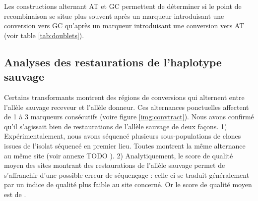 Les constructions alternant AT et GC permettent de déterminer si le point de
recombinaison se situe plus souvent après un marqueur introduisant une
conversion vers GC qu'après un marqueur introduisant une conversion vers AT
(voir table \ref{tab:doublets}).



\subsection{Analyses des restaurations de l'haplotype sauvage}
\label{subsec:restaur}


Certains transformants montrent des régions de conversions qui alternent entre
l'allèle sauvage receveur et l'allèle donneur. Ces alternances ponctuelles
affectent de 1 à 3 marqueurs consécutifs (voire figure \ref{img:convtract}).
Nous avons confirmé qu'il s'agissait bien de restaurations de l'allèle sauvage
de deux façons. 1) Expérimentalement, nous avons séquencé plusieurs
sous-populations de clones issues de l'isolat séquencé en premier lieu. Toutes
montrent la même alternance au même site (voir annexe TODO
). 2) Analytiquement, le score de qualité moyen des sites montrant des
restaurations de l'allèle sauvage permet de s'affranchir d'une possible erreur
de séquençage : celle-ci se traduit généralement par un indice de qualité plus
faible au site concerné. Or le score de qualité moyen est de
.

